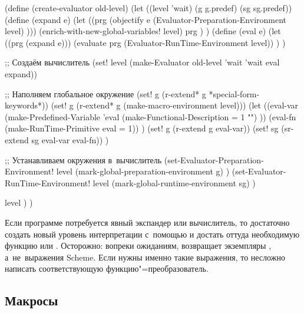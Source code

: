 
\begin{code:lisp}
(define (create-evaluator old-level)
  (let ((level 'wait)
        (g     g.predef)
        (sg    sg.predef))
    (define (expand e)
      (let ((prg (objectify
                  e (Evaluator-Preparation-Environment level) )))
        (enrich-with-new-global-variables! level)
        prg ) )
    (define (eval e)
      (let ((prg (expand e)))
        (evaluate prg (Evaluator-RunTime-Environment level)) ) )

  ;; Создаём вычислитель
    (set! level (make-Evaluator old-level 'wait 'wait eval expand))

  ;; Наполняем глобальное окружение
    (set! g (r-extend* g *special-form-keywords*))
    (set! g (r-extend* g (make-macro-environment level)))
    (let ((eval-var (make-Predefined-Variable
                     'eval (make-Functional-Description = 1 "") ))
          (eval-fn (make-RunTime-Primitive eval = 1)) )
      (set! g (r-extend g eval-var))
      (set! sg (sr-extend sg eval-var eval-fn)) )

  ;; Устанавливаем окружения в~вычислитель
    (set-Evaluator-Preparation-Environment!
     level (mark-global-preparation-environment g) )
    (set-Evaluator-RunTime-Environment!
     level (mark-global-runtime-environment sg) )

    level ) )
\end{code:lisp}

Если программе потребуется явный экспандер или вычислитель, то достаточно
создать новый уровень интерпретации с~помощью  и достать
оттуда необходимую функцию  или . Ос\-то\-рожно: вопреки
ожиданиям,  возвращает экземпляры , а~не~выражения
Scheme. Если нужны именно такие выражения, то несложно написать соответствующую
функцию"=преобразователь. 


\subsection{Макросы}\label{macros/macrosystem/ssect:macros}

